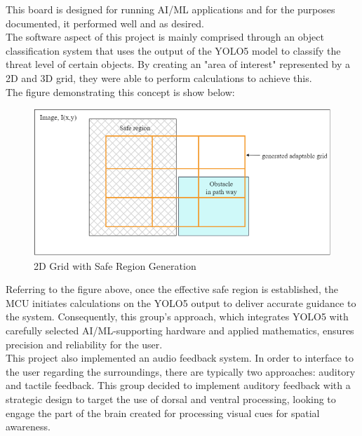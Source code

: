 \noindent This board is designed for running AI/ML applications and for the purposes documented, it performed well and as desired. \\

\noindent The software aspect of this project is mainly comprised through an object classification system that uses the output of the YOLO5 model to classify the threat level of certain objects. By creating an "area of interest" represented by a 2D and 3D grid, they were able to perform calculations to achieve this. \\

\noindent The figure demonstrating this concept is show below:
				
\begin{figure}[H]
	\centering
	\includegraphics[width=\textwidth]{./Images/Figure1_Grid_Detection.png}
	\caption{\label{fig:Grid-Generatio}2D Grid with Safe Region Generation}
\end{figure}

\noindent Referring to the figure above, once the effective safe region is established, the MCU initiates calculations on the YOLO5 output to deliver accurate guidance to the system. Consequently, this group's approach, which integrates YOLO5 with carefully selected AI/ML-supporting hardware and applied mathematics, ensures precision and reliability for the user. \\

\noindent This project also implemented an audio feedback system. In order to interface to the user regarding the surroundings, there are typically two approaches: auditory and tactile feedback. This group decided to implement auditory feedback with a strategic design to target the use of dorsal and ventral processing, looking to engage the part of the brain created for processing visual cues for spatial awareness.\\

